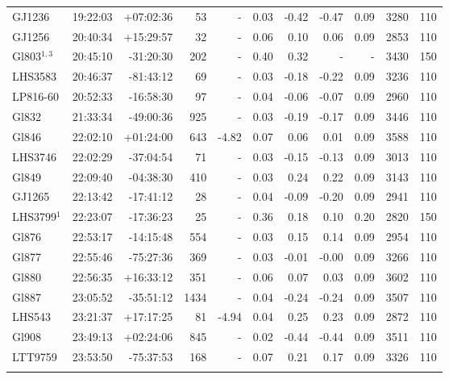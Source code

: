 \documentclass{aa}
\begin{document}
{\begin{longtable}{l r r r r r r r r r r}
GJ1236 & 19:22:03 & +07:02:36 & 53 &    - & 0.03 & -0.42 & -0.47 & 0.09 & 3280 &  110 \\
GJ1256 & 20:40:34 & +15:29:57 & 32 &    - & 0.06 & 0.10 & 0.06 & 0.09 & 2853 &  110 \\
Gl803$^{1,3}$ & 20:45:10 & -31:20:30 & 202 &    - & 0.40 & 0.32 & - & - & 3430 &  150 \\
LHS3583 & 20:46:37 & -81:43:12 & 69 &    - & 0.03 & -0.18 & -0.22 & 0.09 & 3236 &  110 \\
LP816-60 & 20:52:33 & -16:58:30 & 97 &    - & 0.04 & -0.06 & -0.07 & 0.09 & 2960 &  110 \\
Gl832 & 21:33:34 & -49:00:36 & 925 &    - & 0.03 & -0.19 & -0.17 & 0.09 & 3446 &  110 \\
Gl846 & 22:02:10 & +01:24:00 & 643 & -4.82 & 0.07 & 0.06 & 0.01 & 0.09 & 3588 &  110 \\
LHS3746 & 22:02:29 & -37:04:54 & 71 &    - & 0.03 & -0.15 & -0.13 & 0.09 & 3013 &  110 \\
Gl849 & 22:09:40 & -04:38:30 & 410 &    - & 0.03 & 0.24 & 0.22 & 0.09 & 3143 &  110 \\
GJ1265 & 22:13:42 & -17:41:12 & 28 &    - & 0.04 & -0.09 & -0.20 & 0.09 & 2941 &  110 \\
LHS3799$^1$ & 22:23:07 & -17:36:23 & 25 &    - & 0.36 & 0.18 & 0.10 & 0.20 & 2820 &  150 \\
Gl876 & 22:53:17 & -14:15:48 & 554 &    - & 0.03 & 0.15 & 0.14 & 0.09 & 2954 &  110 \\
Gl877 & 22:55:46 & -75:27:36 & 369 &    - & 0.03 & -0.01 & -0.00 & 0.09 & 3266 &  110 \\
Gl880 & 22:56:35 & +16:33:12 & 351 &    - & 0.06 & 0.07 & 0.03 & 0.09 & 3602 &  110 \\
Gl887 & 23:05:52 & -35:51:12 & 1434 &    - & 0.04 & -0.24 & -0.24 & 0.09 & 3507 &  110 \\
LHS543 & 23:21:37 & +17:17:25 & 81 & -4.94 & 0.04 & 0.25 & 0.23 & 0.09 & 2872 &  110 \\
Gl908 & 23:49:13 & +02:24:06 & 845 &    - & 0.02 & -0.44 & -0.44 & 0.09 & 3511 &  110 \\
LTT9759 & 23:53:50 & -75:37:53 & 168 &    - & 0.07 & 0.21 & 0.17 & 0.09 & 3326 &  110 \\
\label{table:full}
\end{longtable}
}
\end{document}
